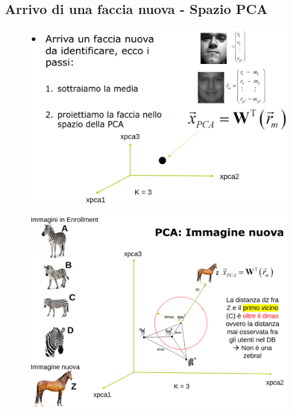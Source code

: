 \documentclass{report}
\begin{document}
\subsection{Arrivo di una faccia nuova - Spazio PCA}
\begin{figure}[H]
    \centering
    \includegraphics[width=1\linewidth]{images/distance2.png}
\end{figure}

\begin{figure}[H]
    \centering
    \includegraphics[width=1\linewidth]{images/imm-new.png}
\end{figure}
\end{document}
